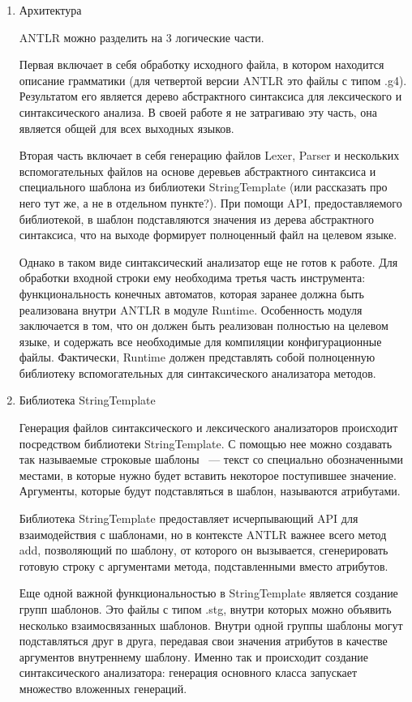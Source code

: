 \begin{enumerate}
    \item Архитектура
    
    ANTLR можно разделить на 3 логические части. 
    
    Первая включает в себя обработку исходного файла, в котором находится описание грамматики 
    (для четвертой версии ANTLR это файлы с типом .g4). 
    Результатом его является дерево абстрактного синтаксиса для лексического и синтаксического анализа. 
    В своей работе я не затрагиваю эту часть, она является общей для всех выходных языков.
    
    Вторая часть включает в себя генерацию файлов Lexer, Parser и нескольких вспомогательных файлов на основе деревьев
    абстрактного синтаксиса и специального шаблона из библиотеки StringTemplate (или рассказать про него тут же, а не в отдельном пункте?). 
    При помощи API, предоставляемого библиотекой, в шаблон подставляются значения из дерева абстрактного синтаксиса, что на выходе формирует
    полноценный файл на целевом языке.
    
    Однако в таком виде синтаксический анализатор еще не готов к работе. 
    Для обработки входной строки ему необходима третья часть инструмента: функциональность конечных автоматов, которая заранее должна быть 
    реализована внутри ANTLR в модуле Runtime. 
    Особенность модуля заключается в том, что он должен быть реализован полностью на целевом языке, и содержать все необходимые для 
    компиляции конфигурационные файлы. 
    Фактически, Runtime должен представлять собой полноценную библиотеку вспомогательных для синтаксического анализатора методов.  
    \item Библиотека StringTemplate

    Генерация файлов синтаксического и лексического анализаторов происходит посредством библиотеки StringTemplate. 
    С помощью нее можно создавать так называемые строковые шаблоны ~--- текст со специально обозначенными местами, в которые нужно 
    будет вставить некоторое поступившее значение. 
    Аргументы, которые будут подставляться в шаблон, называются атрибутами. 

    Библиотека StringTemplate предоставляет исчерпывающий API для взаимодействия с шаблонами, но в контексте ANTLR важнее всего метод add, 
    позволяющий по шаблону, от которого он вызывается, сгенерировать готовую строку с аргументами метода, подставленными вместо атрибутов. 

    Еще одной важной функциональностью в StringTemplate является создание групп шаблонов. 
    Это файлы с типом .stg, внутри которых можно объявить несколько взаимосвязанных шаблонов. 
    Внутри одной группы шаблоны могут подставляться друг в друга, передавая свои значения атрибутов в качестве аргументов внутреннему 
    шаблону. 
    Именно так и происходит создание синтаксического анализатора: генерация основного класса запускает множество вложенных генераций. 


\end{enumerate}

